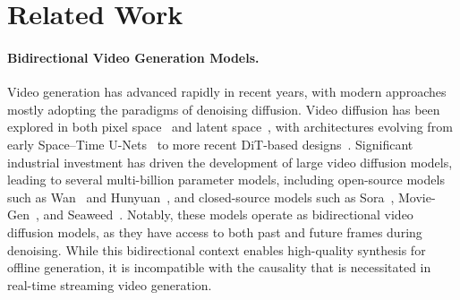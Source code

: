 \section{Related Work}

\paragraph{Bidirectional Video Generation Models.}
Video generation has advanced rapidly in recent years, with modern approaches mostly adopting the paradigms of denoising diffusion. Video diffusion has been explored in both pixel space~\citep{ho2022imagen, singer2022make} and latent space~\citep{blattmann2023align, blattmann2023stable}, with architectures evolving from early Space–Time U-Nets~\citep{blattmann2023stable, hong2022cogvideo} to more recent DiT-based designs~\citep{peebles2023scalable, gupta2024photorealistic}. Significant industrial investment has driven the development of large video diffusion models, leading to several multi-billion parameter models, including open-source models such as Wan~\citep{wan2025wan} and Hunyuan~\citep{kong2024hunyuanvideo}, and closed-source models such as Sora~\citep{openai_sora}, Movie-Gen~\citep{polyak2024movie}, and Seaweed~\citep{seawead2025seaweed}. Notably, these models operate as bidirectional video diffusion models, as they have access to both past and future frames during denoising. While this bidirectional context enables high-quality synthesis for offline generation, it is incompatible with the causality that is necessitated in real-time streaming video generation.


